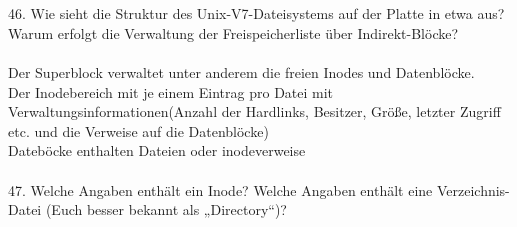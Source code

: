 \documentclass{article}
\begin{document}
\\
\\
46. Wie sieht die Struktur des Unix-V7-Dateisystems auf der Platte in etwa aus? Warum erfolgt
die Verwaltung der Freispeicherliste über Indirekt-Blöcke?
\\
\\
Der Superblock verwaltet unter anderem die freien Inodes und Datenbl\"ocke.\\
Der Inodebereich mit je einem Eintrag pro Datei mit Verwaltungsinformationen(Anzahl der Hardlinks, Besitzer, Gr\"o\ss e, letzter Zugriff etc. und die Verweise auf die Datenbl\"ocke)\\
Dateb\"ocke enthalten Dateien oder inodeverweise
\\
\\
47. Welche Angaben enthält ein Inode? Welche Angaben enthält eine Verzeichnis-Datei (Euch
besser bekannt als „Directory“)?
\\
\\
\end{document}
